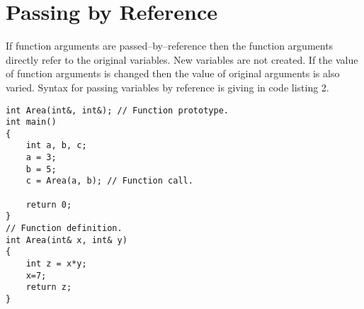 \documentclass[12pt,a4paper]{article}
\begin{document}
\section{Passing by Reference}
If function arguments are passed--by--reference then the function arguments directly refer to the original variables. New variables are not created. If the value of function arguments is changed then the value of original arguments is also varied. Syntax for passing variables by reference is giving in code listing 2.
\begin{lstlisting}[caption={Passing by reference}]
int Area(int&, int&); // Function prototype.
int main()
{
	int a, b, c;
	a = 3;
	b = 5;
	c = Area(a, b); // Function call.
	
	return 0;
}
// Function definition.
int Area(int& x, int& y)
{
	int z = x*y;
	x=7;
	return z;
}
\end{lstlisting}
\end{document}
